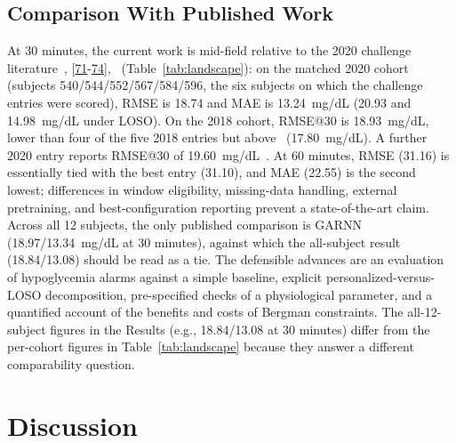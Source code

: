 \documentclass[journal]{IEEEtran}
\begin{document}
\subsection{Comparison With Published Work}

At 30 minutes, the current work is mid-field relative to the 2020 challenge literature~\cite{ref64}, [\hyperref[ref60label]{71}-\hyperref[ref63label]{74}],~\cite{ref65} (Table~\ref{tab:landscape}): on the matched 2020 cohort (subjects 540/544/552/567/584/596, the six subjects on which the challenge entries were scored), RMSE is 18.74 and MAE is 13.24~mg/dL (20.93 and 14.98~mg/dL under LOSO). On the 2018 cohort, RMSE@30 is 18.93~mg/dL, lower than four of the five 2018 entries but above~\cite{ref59} (17.80~mg/dL). A further 2020 entry reports RMSE@30 of 19.60~mg/dL~\cite{ref70}. At 60 minutes, RMSE (31.16) is essentially tied with the best entry (31.10), and MAE (22.55) is the second lowest; differences in window eligibility, missing-data handling, external pretraining, and best-configuration reporting prevent a state-of-the-art claim. Across all 12 subjects, the only published comparison is GARNN~\cite{ref75} (18.97/13.34~mg/dL at 30 minutes), against which the all-subject result (18.84/13.08) should be read as a tie. The defensible advances are an evaluation of hypoglycemia alarms against a simple baseline, explicit personalized-versus-LOSO decomposition, pre-specified checks of a physiological parameter, and a quantified account of the benefits and costs of Bergman constraints. The all-12-subject figures in the Results (e.g., 18.84/13.08 at 30 minutes) differ from the per-cohort figures in Table~\ref{tab:landscape} because they answer a different comparability question.






\section{Discussion}
\end{document}
